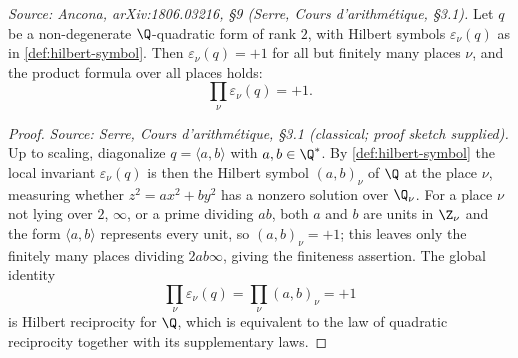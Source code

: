 \begin{theorem}
  \label{thm:product-formula}
  \textit{Source: Ancona, arXiv:1806.03216, §9 (Serre, \emph{Cours d'arithmétique}, §3.1).}
  Let \(q\) be a non-degenerate \(\Q\)-quadratic form of rank \(2\), with Hilbert
  symbols \(\varepsilon_\nu(q)\) as in \cref{def:hilbert-symbol}. Then
  \(\varepsilon_\nu(q) = +1\) for all but finitely many places \(\nu\), and the
  product formula over all places holds:
  \[\prod_\nu \varepsilon_\nu(q) = +1.\]
\end{theorem}

\begin{proof}
  \textit{Source: Serre, Cours d'arithmétique, §3.1 (classical; proof sketch
  supplied).}
  Up to scaling, diagonalize \(q = \langle a, b \rangle\) with
  \(a, b \in \Q^*\). By \cref{def:hilbert-symbol} the local invariant
  \(\varepsilon_\nu(q)\) is then the Hilbert symbol \((a,b)_\nu\) of \(\Q\) at
  the place \(\nu\), measuring whether \(z^2 = a x^2 + b y^2\) has a nonzero
  solution over \(\Q_\nu\). For a place \(\nu\) not lying over \(2\), \(\infty\),
  or a prime dividing \(ab\), both \(a\) and \(b\) are units in \(\Z_\nu\) and
  the form \(\langle a, b \rangle\) represents every unit, so
  \((a,b)_\nu = +1\); this leaves only the finitely many places dividing
  \(2 a b \infty\), giving the finiteness assertion. The global identity
  \[\prod_\nu \varepsilon_\nu(q) = \prod_\nu (a,b)_\nu = +1\]
  is Hilbert reciprocity for \(\Q\), which is equivalent to the law of quadratic
  reciprocity together with its supplementary laws.
\end{proof}

